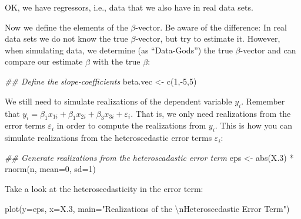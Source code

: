 \documentclass[
  letterpaper,
  DIV=11,
  numbers=noendperiod]{scrreprt}
\newenvironment{Shaded}{\begin{snugshade}}{\end{snugshade}}
\newcommand{\AttributeTok}[1]{\textcolor[rgb]{0.40,0.45,0.13}{#1}}
\newcommand{\DecValTok}[1]{\textcolor[rgb]{0.68,0.00,0.00}{#1}}
\newcommand{\DocumentationTok}[1]{\textcolor[rgb]{0.37,0.37,0.37}{\textit{#1}}}
\newcommand{\FloatTok}[1]{\textcolor[rgb]{0.68,0.00,0.00}{#1}}
\newcommand{\FunctionTok}[1]{\textcolor[rgb]{0.28,0.35,0.67}{#1}}
\newcommand{\NormalTok}[1]{\textcolor[rgb]{0.00,0.23,0.31}{#1}}
\newcommand{\OtherTok}[1]{\textcolor[rgb]{0.00,0.23,0.31}{#1}}
\newcommand{\SpecialCharTok}[1]{\textcolor[rgb]{0.37,0.37,0.37}{#1}}
\newcommand{\StringTok}[1]{\textcolor[rgb]{0.13,0.47,0.30}{#1}}
\theoremstyle{definition}
\theoremstyle{plain}
\theoremstyle{plain}
\theoremstyle{remark}
\begin{document}
OK, we have regressors, i.e., data that we also have in real data sets.

Now we define the elements of the \(\beta\)-vector. Be aware of the
difference: In real data sets we do not know the true \(\beta\)-vector,
but try to estimate it. However, when simulating data, we determine (as
``Data-Gods'') the true \(\beta\)-vector and can compare our estimate
\(\hat{\beta}\) with the true \(\beta\):

\begin{Shaded}
\begin{Highlighting}[]
\DocumentationTok{\#\# Define the slope{-}coefficients}
\NormalTok{beta.vec  }\OtherTok{\textless{}{-}} \FunctionTok{c}\NormalTok{(}\DecValTok{1}\NormalTok{,}\SpecialCharTok{{-}}\DecValTok{5}\NormalTok{,}\DecValTok{5}\NormalTok{)}
\end{Highlighting}
\end{Shaded}

\hfill\break
We still need to simulate realizations of the dependent variable
\(y_i\). Remember that
\(y_i=\beta_1 x_{1i}+\beta_1 x_{2i}+\beta_3 x_{3i}+\varepsilon_{i}\).
That is, we only need realizations from the error terms
\(\varepsilon_i\) in order to compute the realizations from \(y_i\).
This is how you can simulate realizations from the heteroscedastic error
terms \(\varepsilon_i\):

\begin{Shaded}
\begin{Highlighting}[]
\DocumentationTok{\#\# Generate realizations from the heteroscadastic error term}
\NormalTok{eps       }\OtherTok{\textless{}{-}} \FunctionTok{abs}\NormalTok{(X}\FloatTok{.3}\NormalTok{) }\SpecialCharTok{*} \FunctionTok{rnorm}\NormalTok{(n, }\AttributeTok{mean=}\DecValTok{0}\NormalTok{, }\AttributeTok{sd=}\DecValTok{1}\NormalTok{)}
\end{Highlighting}
\end{Shaded}

Take a look at the heteroscedasticity in the error term:

\begin{Shaded}
\begin{Highlighting}[]
\FunctionTok{plot}\NormalTok{(}\AttributeTok{y=}\NormalTok{eps, }\AttributeTok{x=}\NormalTok{X}\FloatTok{.3}\NormalTok{, }
     \AttributeTok{main=}\StringTok{"Realizations of the }\SpecialCharTok{\textbackslash{}n}\StringTok{Heteroscedastic Error Term"}\NormalTok{)}
\end{Highlighting}
\end{Shaded}
\end{document}
